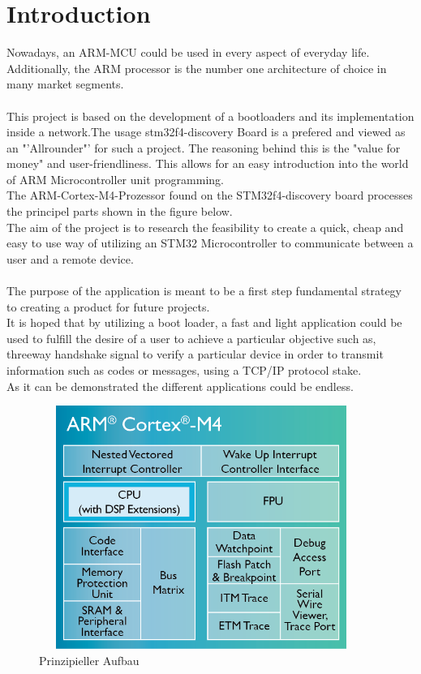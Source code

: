 \chapter{Introduction}
 
Nowadays, an ARM-MCU could be used in every aspect of everyday life.
Additionally, the ARM processor is the number one architecture of choice in 
many market segments.\\\\ 
This project is based on the development of a bootloaders and its implementation 
inside a network.The usage stm32f4-discovery Board is a prefered and viewed as an 
"'Allrounder"' for such a project. The reasoning behind this is the "value for money" 
and user-friendliness. This allows for an easy introduction into the world of ARM
Microcontroller unit programming.\\
The ARM-Cortex-M4-Prozessor found on the STM32f4-discovery board processes 
the principel parts shown in the figure below.\\
The aim of the project is to research the feasibility to create a quick, cheap 
and easy to use way of utilizing an STM32 Microcontroller to communicate between 
a user and a remote device.\\\\
The purpose of the application is meant to be a first step fundamental strategy to 
creating a product for future projects.\\
It is hoped that by utilizing a boot loader, a fast and light application could 
be used to fulfill the desire of a user to achieve a particular objective such 
as, threeway handshake signal to verify a particular device in order to transmit 
information such as codes or messages, using a TCP/IP protocol stake.\\
As it can be demonstrated the different applications could be endless.\\ 

\begin{figure}[ht]
	\centering
	\includegraphics[width=400px, height=300px]{../img/Cortex-M4-chip-diagram-LG.png}
	\caption{Prinzipieller Aufbau}
	\label{m4_prinzip}
\end{figure}

